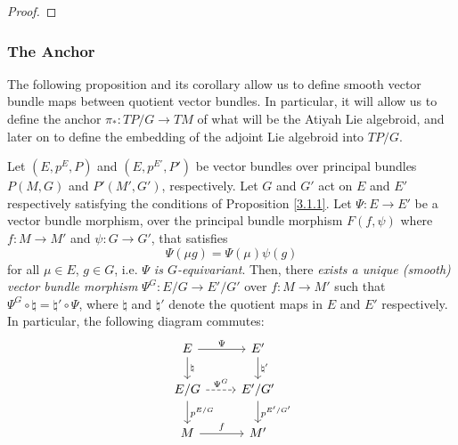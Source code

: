 \begin{proof}
\end{proof}

\subsubsection{The Anchor}

The following proposition and its corollary allow us to define smooth vector bundle maps between quotient vector bundles. In particular, it will allow us to define the anchor $\pi_*:TP/G \to TM$ of what will be the Atiyah Lie algebroid, and later on to define the embedding of the adjoint Lie algebroid into $TP/G$.

\begin{proposition} \label{3.1.2}
Let $(E, p^E, P)$ and $(E, p^{E'}, P')$ be vector bundles over principal bundles $P(M, G)$ and $P'(M', G')$, respectively. Let $G$ and $G'$ act on $E$ and $E'$ respectively satisfying the conditions of Proposition \ref{3.1.1}. Let $\Psi: E \to E'$ be a vector bundle morphism, over the principal bundle morphism $F(f, \psi)$ where $f:M\to M'$ and $\psi:G \to G'$, that satisfies \[\Psi(\mu g) = \Psi(\mu) \psi(g)\] for all $\mu \in E$, $g \in G$, i.e. \emph{$\Psi$ is $G$-equivariant}. Then, there \emph{exists a unique (smooth) vector bundle morphism} $\Psi^{G}: E/G \to E'/G'$ over $f: M \to M'$ such that $\Psi^{G} \circ \natural = \natural' \circ \Psi$, where $\natural$ and $\natural'$ denote the quotient maps in $E$ and $E'$ respectively. In particular, the following diagram commutes:
\begin{equation} \label{diagramQuotientMorph}
\begin{tikzcd}
    E   \ar{r}{\Psi}     \ar{d}{\natural} &   E'  \ar{d}{\natural'} \\
    E/G \ar[dashed]{r}{\Psi^{G}} \ar{d}{p^{E/G}}  & E'/G' \ar{d}{p^{E'/G'}} \\
    M \ar{r}{f} & M'
\end{tikzcd}
\end{equation}
\end{proposition}

